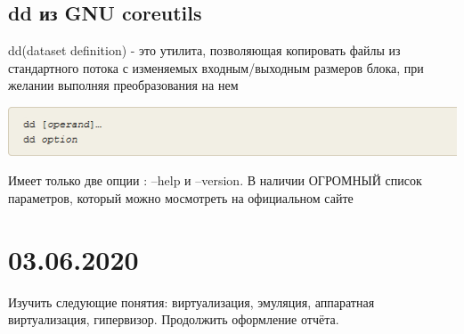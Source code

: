 \documentclass[a4paper,14pt]{extarticle}
\begin{document}
\subsection{dd из GNU coreutils}
dd(dataset definition) - это утилита, позволяющая копировать файлы из стандартного потока с изменяемых входным/выходным размеров блока, при желании выполняя преобразования на нем
\begin{center}
  \includegraphics{img/dd.png}
\end{center}
Имеет только две опции : --help и --version. В наличии ОГРОМНЫЙ список параметров, который можно мосмотреть на официальном сайте\cite{gnu-dd}
\newpage
\section{03.06.2020}
Изучить следующие понятия: виртуализация, эмуляция, аппаратная виртуализация, гипервизор. Продолжить оформление отчёта.
\end{document}
